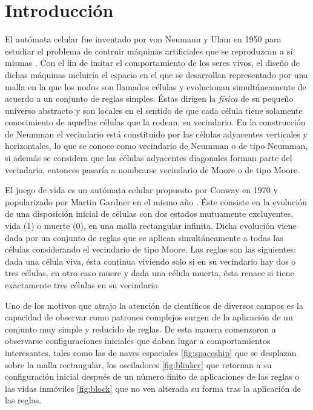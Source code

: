 \documentclass[../proyecto.tex]{book}
\begin{document}
\chapter{Introducción}

El autómata celular fue inventado por von Neumann y Ulam en 1950 para estudiar el problema de contruir máquinas artificiales que se reproduzcan a sí mismas \cite{neummanUlam}. Con el fin de imitar el comportamiento de los seres vivos, el diseño de dichas máquinas incluiría el espacio en el que se desarrollan representado por una malla en la que los nodos son llamados células y evolucionan simultáneamente de acuerdo a un conjunto de reglas simples. Éstas dirigen la \textit{física} de su pequeño universo abstracto y son locales en el sentido de que cada célula tiene solamente conocimiento de aquellas células que la rodean, su vecindario. En la construcción de Neumman el vecindario está constituido por las células adyacentes verticales y horizontales, lo que se conoce como vecindario de Neumman o de tipo Neumman, si además se considera que las células adyacentes diagonales forman parte del vecindario, entonces pasaría a nombrarse vecindario de Moore o de tipo Moore.

El juego de vida es un autómata celular propuesto por Conway en 1970 y popularizado por Martin Gardner en el mismo año \cite{primerap}. Éste consiste en la evolución de una disposición inicial de células con dos estados mutuamente excluyentes, vida (1) o muerte (0), en una malla rectangular infinita. Dicha evolución viene dada por un conjunto de reglas que se aplican simultáneamente a todas las células considerando el vecindario de tipo Moore. Las reglas son las siguientes: dada una célula viva, ésta continua viviendo solo si en su vecindario hay dos o tres células, en otro caso muere y dada una célula muerta, ésta renace si tiene exactamente tres células en su vecindario.

Uno de los motivos que atrajo la atención de científicos de diversos campos es la capacidad de observar como patrones complejos surgen de la aplicación de un conjunto muy simple y reducido de reglas. De esta manera comenzaron a observarse configuraciones iniciales que daban lugar a comportamientos interesantes, tales como las de naves espaciales \ref{fig:spaceship} que se desplazan sobre la malla rectangular, los osciladores \ref{fig:blinker} que retornan a su configuración inicial después de un número finito de aplicaciones de las reglas o las vidas inmóviles \ref{fig:block} que no ven alterada su forma tras la aplicación de las reglas.
\end{document}
